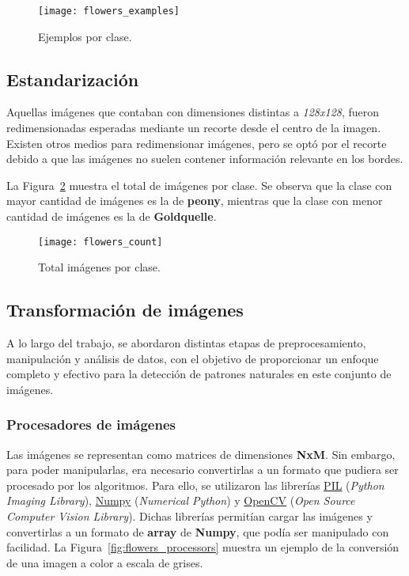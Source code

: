 \documentclass{article}
\begin{document}
\begin{figure}[h!]
  \centering
  \texttt{[image: flowers\_examples]}\rule[-0cm]{0cm}{0cm}
  \caption{Ejemplos por clase.}
  \label{fig:flowers_examples}
\end{figure}

\subsection{Estandarización}
Aquellas imágenes que contaban con dimensiones distintas a \textit{128x128}, fueron redimensionadas esperadas mediante un recorte desde el centro de la imagen. Existen otros medios para redimensionar imágenes, pero se optó por el recorte debido a que las imágenes no suelen contener información relevante en los bordes.

La Figura~\ref{fig:flowers_count} muestra el total de imágenes por clase. Se observa que la clase con mayor cantidad de imágenes es la de \textbf{peony}, mientras que la clase con menor cantidad de imágenes es la de \textbf{Goldquelle}.

\begin{figure}[h!]
  \centering
  \texttt{[image: flowers\_count]}\rule[-0cm]{0cm}{0cm}
  \caption{Total imágenes por clase.}
  \label{fig:flowers_count}
\end{figure}


\subsection{Transformación de imágenes}

A lo largo del trabajo, se abordaron distintas etapas de preprocesamiento, manipulación y análisis de datos, con el objetivo de proporcionar un enfoque completo y efectivo para la detección de patrones naturales en este conjunto de imágenes.

\subsubsection{Procesadores de imágenes}

Las imágenes se representan como matrices de dimensiones \textbf{NxM}. Sin embargo, para poder manipularlas, era necesario convertirlas a un formato que pudiera ser procesado por los algoritmos. Para ello, se utilizaron las librerías \href{https://pillow.readthedocs.io/en/stable/}{PIL} (\textit{Python Imaging Library}), \href{https://numpy.org/}{Numpy} (\textit{Numerical Python}) y \href{https://opencv.org/}{OpenCV} (\textit{Open Source Computer Vision Library}). Dichas librerías permitían cargar las imágenes y convertirlas a un formato de \textbf{array} de \textbf{Numpy}, que podía ser manipulado con facilidad. La Figura~\ref{fig:flowers_processors} muestra un ejemplo de la conversión de una imagen a color a escala de grises.
\end{document}
